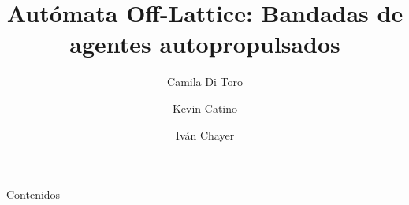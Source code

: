\documentclass[dvipsnames,mathserif]{beamer}
\begin{document}
\rightskip\rightmargin
\title{Autómata Off-Lattice: Bandadas de agentes autopropulsados}
\author[Di Toro, Catino, Chayer]{Camila Di Toro \and Kevin Catino \and Iván Chayer}
\institute{}
\date{}

\begin{frame}
\maketitle
\vfill
{}
\end{frame}

\begin{frame}{Contenidos}
\footnotesize \tableofcontents
\end{frame}





\end{document}
